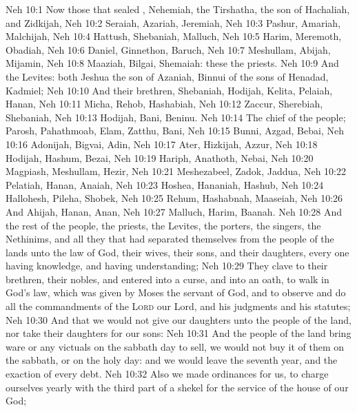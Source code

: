 \vs Neh 10:1 Now those that sealed , Nehemiah, the Tirshatha, the son of Hachaliah, and Zidkijah,
\vs Neh 10:2 Seraiah, Azariah, Jeremiah,
\vs Neh 10:3 Pashur, Amariah, Malchijah,
\vs Neh 10:4 Hattush, Shebaniah, Malluch,
\vs Neh 10:5 Harim, Meremoth, Obadiah,
\vs Neh 10:6 Daniel, Ginnethon, Baruch,
\vs Neh 10:7 Meshullam, Abijah, Mijamin,
\vs Neh 10:8 Maaziah, Bilgai, Shemaiah: these  the priests.
\vs Neh 10:9 And the Levites: both Jeshua the son of Azaniah, Binnui of the sons of Henadad, Kadmiel;
\vs Neh 10:10 And their brethren, Shebaniah, Hodijah, Kelita, Pelaiah, Hanan,
\vs Neh 10:11 Micha, Rehob, Hashabiah,
\vs Neh 10:12 Zaccur, Sherebiah, Shebaniah,
\vs Neh 10:13 Hodijah, Bani, Beninu.
\vs Neh 10:14 The chief of the people; Parosh, Pahathmoab, Elam, Zatthu, Bani,
\vs Neh 10:15 Bunni, Azgad, Bebai,
\vs Neh 10:16 Adonijah, Bigvai, Adin,
\vs Neh 10:17 Ater, Hizkijah, Azzur,
\vs Neh 10:18 Hodijah, Hashum, Bezai,
\vs Neh 10:19 Hariph, Anathoth, Nebai,
\vs Neh 10:20 Magpiash, Meshullam, Hezir,
\vs Neh 10:21 Meshezabeel, Zadok, Jaddua,
\vs Neh 10:22 Pelatiah, Hanan, Anaiah,
\vs Neh 10:23 Hoshea, Hananiah, Hashub,
\vs Neh 10:24 Hal\-lo\-hesh, Pileha, Shobek,
\vs Neh 10:25 Re\-hum, Hashabnah, Maaseiah,
\vs Neh 10:26 And Ahijah, Hanan, Anan,
\vs Neh 10:27 Mal\-luch, Harim, Baanah.
\vs Neh 10:28 And the rest of the people, the priests, the Levites, the porters, the singers, the Nethinims, and all they that had separated themselves from the people of the lands unto the law of God, their wives, their sons, and their daughters, every one having knowledge, and having understanding;
\vs Neh 10:29 They clave to their brethren, their nobles, and entered into a curse, and into an oath, to walk in God's law, which was given by Moses the servant of God, and to observe and do all the commandments of the \textsc{Lord} our Lord, and his judgments and his statutes;
\vs Neh 10:30 And that we would not give our daughters unto the people of the land, nor take their daughters for our sons:
\vs Neh 10:31 And  the people of the land bring ware or any victuals on the sabbath day to sell,  we would not buy it of them on the sabbath, or on the holy day: and  we would leave the seventh year, and the exaction of every debt.
\vs Neh 10:32 Also we made ordinances for us, to charge ourselves yearly with the third part of a shekel for the service of the house of our God;
